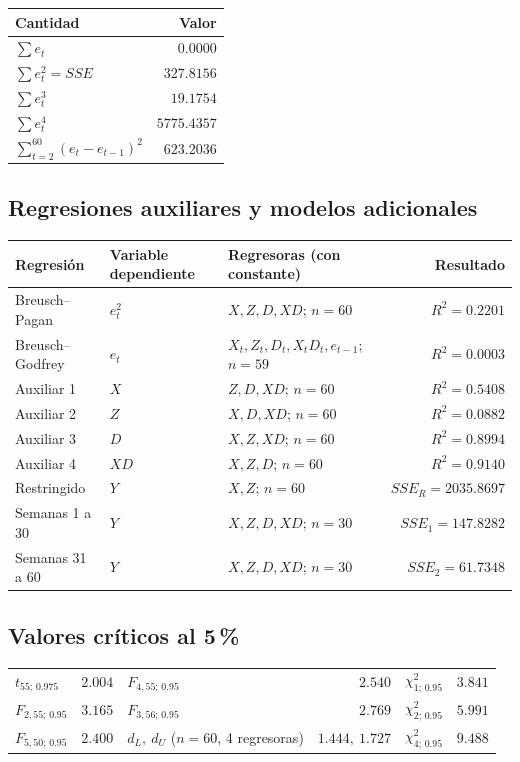 \begin{center}
\begin{tabular}{@{}lr@{}}
\toprule
Cantidad & Valor\\
\midrule
$\sum e_t$ & $0.0000$\\
$\sum e_t^2=SSE$ & $327.8156$\\
$\sum e_t^3$ & $19.1754$\\
$\sum e_t^4$ & $5775.4357$\\
$\sum_{t=2}^{60}(e_t-e_{t-1})^2$ & $623.2036$\\
\bottomrule
\end{tabular}
\end{center}

\subsection*{Regresiones auxiliares y modelos adicionales}

\begin{center}
\begin{tabular}{@{}lllr@{}}
\toprule
Regresión & Variable dependiente & Regresoras (con constante) & Resultado\\
\midrule
Breusch--Pagan & $e_t^2$ & $X,Z,D,XD$; $n=60$ & $R^2=0.2201$\\
Breusch--Godfrey & $e_t$ & $X_t,Z_t,D_t,X_tD_t,e_{t-1}$; $n=59$ & $R^2=0.0003$\\
Auxiliar 1 & $X$ & $Z,D,XD$; $n=60$ & $R^2=0.5408$\\
Auxiliar 2 & $Z$ & $X,D,XD$; $n=60$ & $R^2=0.0882$\\
Auxiliar 3 & $D$ & $X,Z,XD$; $n=60$ & $R^2=0.8994$\\
Auxiliar 4 & $XD$ & $X,Z,D$; $n=60$ & $R^2=0.9140$\\
Restringido & $Y$ & $X,Z$; $n=60$ & $SSE_R=2035.8697$\\
Semanas 1 a 30 & $Y$ & $X,Z,D,XD$; $n=30$ & $SSE_1=147.8282$\\
Semanas 31 a 60 & $Y$ & $X,Z,D,XD$; $n=30$ & $SSE_2=61.7348$\\
\bottomrule
\end{tabular}
\end{center}

\subsection*{Valores críticos al 5\,\%}

\begin{center}
\begin{tabular}{@{}lr@{\qquad}lr@{\qquad}lr@{}}
\toprule
$t_{55;\,0.975}$ & $2.004$ & $F_{4,55;\,0.95}$ & $2.540$ & $\chi^2_{1;\,0.95}$ & $3.841$\\
$F_{2,55;\,0.95}$ & $3.165$ & $F_{3,56;\,0.95}$ & $2.769$ & $\chi^2_{2;\,0.95}$ & $5.991$\\
$F_{5,50;\,0.95}$ & $2.400$ & $d_L,\ d_U$ ($n=60$, 4 regresoras) & $1.444,\ 1.727$ & $\chi^2_{4;\,0.95}$ & $9.488$\\
\bottomrule
\end{tabular}
\end{center}

